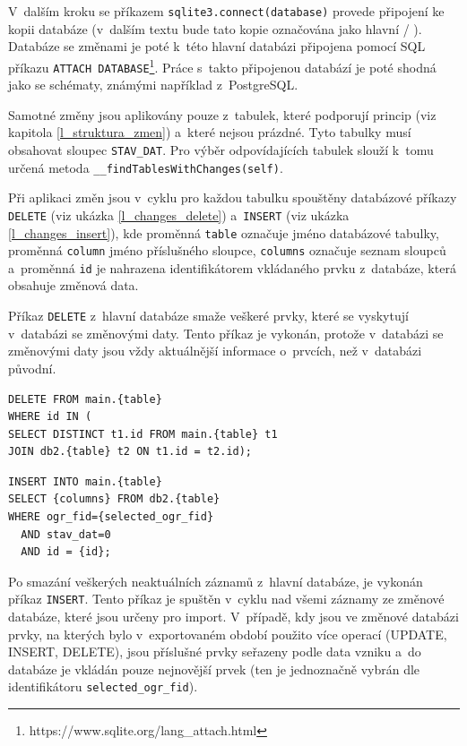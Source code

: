 \documentclass[a4paper,12pt,oneside]{book}
\begin{document}
V~dalším kroku se příkazem \texttt{sqlite3.connect(database)} provede
připojení ke kopii databáze (v~dalším textu bude tato kopie označována
jako hlavní / ). Databáze se změnami je poté k~této hlavní
databázi připojena pomocí SQL příkazu \texttt{ATTACH
  DATABASE}\footnote{https://www.sqlite.org/lang\_attach.html}. Práce
s~takto připojenou databází je poté shodná jako se schématy, známými
například z~PostgreSQL.

Samotné změny jsou aplikovány pouze z~tabulek, které podporují princip
 (viz kapitola \ref{l_struktura_zmen}) a~které nejsou
prázdné. Tyto tabulky musí obsahovat sloupec \texttt{STAV\_DAT}. Pro
výběr odpovídajících tabulek slouží k~tomu určená metoda
\texttt{\_\_findTablesWithChanges(self)}.

Při aplikaci změn jsou v~cyklu pro každou tabulku spouštěny databázové
příkazy \texttt{DELETE} (viz ukázka \ref{l_changes_delete})
a~\texttt{INSERT} (viz ukázka \ref{l_changes_insert}), kde proměnná
\texttt{table} označuje jméno databázové tabulky, proměnná
\texttt{column} jméno příslušného sloupce, \texttt{columns} označuje
seznam sloupců a~proměnná \texttt{id} je nahrazena identifikátorem
vkládaného prvku z~databáze, která obsahuje změnová data.

Příkaz \texttt{DELETE} z~hlavní databáze smaže veškeré prvky, které se
vyskytují v~databázi se změnovými daty. Tento příkaz je vykonán,
protože v~databázi se změnovými daty jsou vždy aktuálnější informace
o~prvcích, než v~databázi původní.

\begin{lstlisting}[style=sql, caption={Aplikace změn -- příkaz DELETE}, 
		    label=l_changes_delete]
DELETE FROM main.{table}
WHERE id IN (
SELECT DISTINCT t1.id FROM main.{table} t1
JOIN db2.{table} t2 ON t1.id = t2.id);
\end{lstlisting}

\begin{lstlisting}[style=sql, 
		    caption={Aplikace změn -- příkaz INSERT}, 
		    label=l_changes_insert]
INSERT INTO main.{table}
SELECT {columns} FROM db2.{table}
WHERE ogr_fid={selected_ogr_fid}
  AND stav_dat=0
  AND id = {id};
\end{lstlisting}

Po smazání veškerých neaktuálních záznamů z~hlavní databáze, je
vykonán příkaz \texttt{INSERT}. Tento příkaz je spuštěn v~cyklu nad
všemi záznamy ze změnové databáze, které jsou určeny pro
import. V~případě, kdy jsou ve změnové databázi prvky, na kterých bylo
v~exportovaném období použito více operací (UPDATE, INSERT, DELETE),
jsou příslušné prvky seřazeny podle data vzniku a~do databáze je
vkládán pouze nejnovější prvek (ten je jednoznačně vybrán dle
identifikátoru \texttt{selected\_ogr\_fid}).
\end{document}
